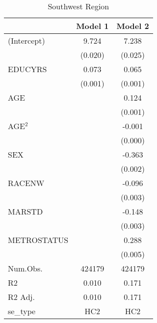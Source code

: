 \documentclass[12pt, English]{article}
\begin{document}
\begin{table}
\centering %
    \caption{Southwest Region}
    \vspace{7.5mm} %
\begin{tabular}[t]{lcc}
\toprule
  & Model 1 & Model 2\\
\midrule
(Intercept) & 9.724 & 7.238\\
 & (0.020) & (0.025)\\
EDUCYRS & 0.073 & 0.065\\
 & (0.001) & (0.001)\\
AGE &  & 0.124\\
 &  & (0.001)\\
AGE$^2$ &  & -0.001\\
 &  & (0.000)\\
SEX &  & -0.363\\
 &  & (0.002)\\
RACENW &  & -0.096\\
 &  & \vphantom{1} (0.003)\\
MARSTD &  & -0.148\\
 &  & (0.003)\\
METROSTATUS &  & 0.288\\
 &  & (0.005)\\
\midrule
Num.Obs. & 424179 & 424179\\
R2 & 0.010 & 0.171\\
R2 Adj. & 0.010 & 0.171\\
se\_type & HC2 & HC2\\
\bottomrule
\end{tabular}
\end{table}




\newpage
\end{document}
